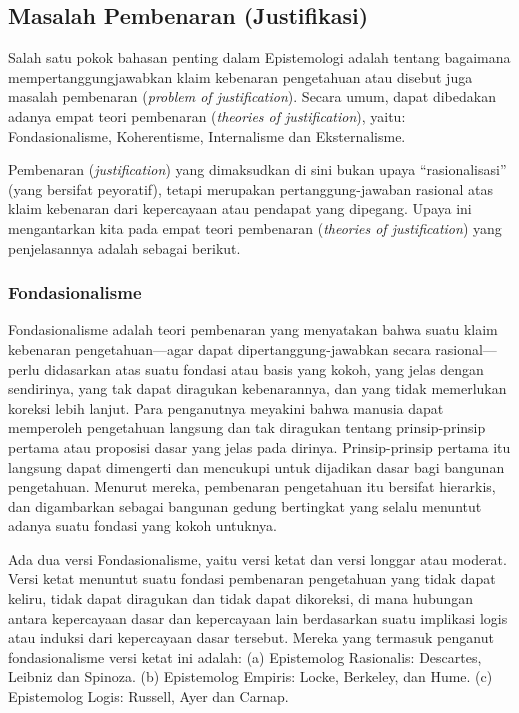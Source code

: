\documentclass[10pt,a4paper]{article}
\renewenvironment{quote}
{\list{}{%
       \leftmargin 1.5em 
       \rightmargin 0em}
   \item\relax}
{\endlist}
\begin{document}
\begin{multicols}{2}
\hypertarget{masalah-pembenaran-justifikasi}{%
\subsection{Masalah Pembenaran
(Justifikasi)}\label{masalah-pembenaran-justifikasi}}

\begin{quote}
Salah satu pokok bahasan penting dalam Epistemologi adalah tentang
bagaimana mempertanggungjawabkan klaim kebenaran pengetahuan atau
disebut juga masalah pembenaran (\emph{problem of justification}).
Secara umum, dapat dibedakan adanya empat teori pembenaran
(\emph{theories of justification}), yaitu: Fondasionalisme,
Koherentisme, Internalisme dan Eksternalisme.
\end{quote}

Pembenaran (\emph{justification}) yang dimaksudkan di sini bukan upaya
``rasionalisasi'' (yang bersifat peyoratif), tetapi merupakan
pertanggung-jawaban rasional atas klaim kebenaran dari kepercayaan atau
pendapat yang dipegang. Upaya ini mengantarkan kita pada empat teori
pembenaran (\emph{theories of justification}) yang penjelasannya adalah
sebagai berikut.

\hypertarget{fondasionalisme}{%
\subsubsection{Fondasionalisme}\label{fondasionalisme}}

Fondasionalisme adalah teori pembenaran yang menyatakan bahwa suatu
klaim kebenaran pengetahuan---agar dapat dipertanggung-jawabkan secara
rasional---perlu didasarkan atas suatu fondasi atau basis yang kokoh,
yang jelas dengan sendirinya, yang tak dapat diragukan kebenarannya, dan
yang tidak memerlukan koreksi lebih lanjut. Para penganutnya meyakini
bahwa manusia dapat memperoleh pengetahuan langsung dan tak diragukan
tentang prinsip-prinsip pertama atau proposisi dasar yang jelas pada
dirinya. Prinsip-prinsip pertama itu langsung dapat dimengerti dan
mencukupi untuk dijadikan dasar bagi bangunan pengetahuan. Menurut
mereka, pembenaran pengetahuan itu bersifat hierarkis, dan digambarkan
sebagai bangunan gedung bertingkat yang selalu menuntut adanya suatu
fondasi yang kokoh untuknya.

Ada dua versi Fondasionalisme, yaitu versi ketat dan versi longgar atau
moderat. Versi ketat menuntut suatu fondasi pembenaran pengetahuan yang
tidak dapat keliru, tidak dapat diragukan dan tidak dapat dikoreksi, di
mana hubungan antara kepercayaan dasar dan kepercayaan lain berdasarkan
suatu implikasi logis atau induksi dari kepercayaan dasar tersebut.
Mereka yang termasuk penganut fondasionalisme versi ketat ini adalah:
(a) Epistemolog Rasionalis: Descartes, Leibniz dan Spinoza. (b)
Epistemolog Empiris: Locke, Berkeley, dan Hume. (c) Epistemolog Logis:
Russell, Ayer dan Carnap.


\end{multicols}
\end{document}
